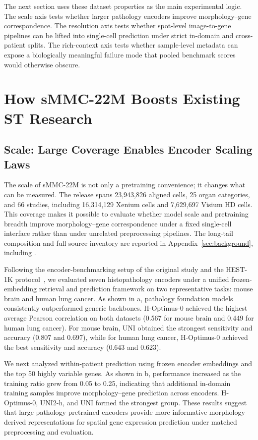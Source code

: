 \documentclass{article}
\newcommand{\dataset}{sMMC-22M\xspace}
\begin{document}
The next section uses these dataset properties as the main experimental logic. The scale axis tests whether larger pathology encoders improve morphology--gene correspondence. The resolution axis tests whether spot-level image-to-gene pipelines can be lifted into single-cell prediction under strict in-domain and cross-patient splits. The rich-context axis tests whether sample-level metadata can expose a biologically meaningful failure mode that pooled benchmark scores would otherwise obscure.

\section{How \dataset Boosts Existing ST Research}
\subsection{Scale: Large Coverage Enables Encoder Scaling Laws}
The scale of \dataset is not only a pretraining convenience; it changes what can be measured. The release spans 23{,}943{,}826 aligned cells, 25 organ categories, and 66 studies, including 16{,}314{,}129 Xenium cells and 7{,}629{,}697 Visium HD cells. This coverage makes it possible to evaluate whether model scale and pretraining breadth improve morphology--gene correspondence under a fixed single-cell interface rather than under unrelated preprocessing pipelines. The long-tail composition and full source inventory are reported in Appendix~\ref{sec:background}, including .

Following the encoder-benchmarking setup of the original study and the HEST-1K protocol~\cite{jaume2025hest}, we evaluated seven histopathology encoders under a unified frozen-embedding retrieval and prediction framework on two representative tasks: mouse brain and human lung cancer. As shown in a, pathology foundation models consistently outperformed generic backbones. H-Optimus-0 achieved the highest average Pearson correlation on both datasets (0.567 for mouse brain and 0.449 for human lung cancer). For mouse brain, UNI obtained the strongest sensitivity and accuracy (0.807 and 0.697), while for human lung cancer, H-Optimus-0 achieved the best sensitivity and accuracy (0.643 and 0.623).

We next analyzed within-patient prediction using frozen encoder embeddings and the top 50 highly variable genes. As shown in b, performance increased as the training ratio grew from 0.05 to 0.25, indicating that additional in-domain training samples improve morphology--gene prediction across encoders. H-Optimus-0, UNI2-h, and UNI formed the strongest group. These results suggest that large pathology-pretrained encoders provide more informative morphology-derived representations for spatial gene expression prediction under matched preprocessing and evaluation.
\end{document}
